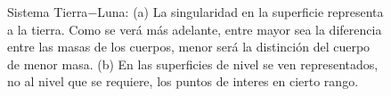 \begin{figure}[H]
\centering
{}\qquad
{}
\caption{Sistema Tierra$-$Luna: (a) La singularidad en la superficie representa a la tierra. Como se verá más adelante, entre mayor sea la diferencia entre las masas de los cuerpos, menor será la distinción del cuerpo de menor masa. (b) En las superficies de nivel se ven representados, no al nivel que se requiere, los puntos de interes en cierto rango.}
\label{fig: surperficie, cn t-l}
\end{figure}
\newpage
